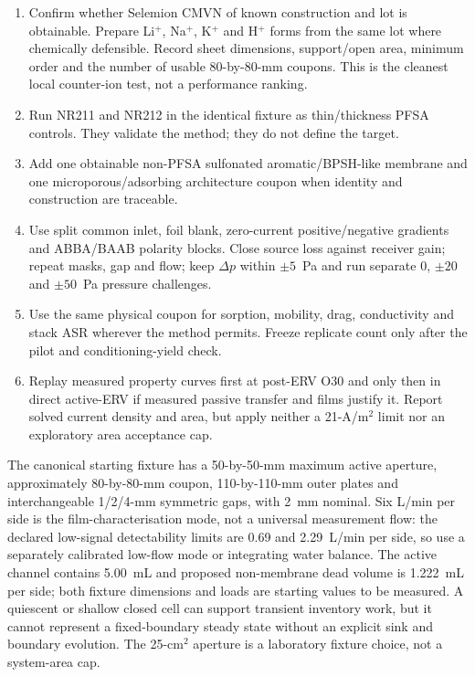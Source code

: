 \documentclass[10pt,a4paper]{article}
\begin{document}
\begin{enumerate}
  \item Confirm whether Selemion CMVN of known construction and lot is
    obtainable. Prepare Li$^+$, Na$^+$, K$^+$ and H$^+$ forms from the same lot
    where chemically defensible. Record sheet dimensions, support/open area,
    minimum order and the number of usable 80-by-80-mm coupons. This is the
    cleanest local counter-ion test, not a performance ranking.
  \item Run NR211 and NR212 in the identical fixture as thin/thickness PFSA
    controls. They validate the method; they do not define the target.
  \item Add one obtainable non-PFSA sulfonated aromatic/BPSH-like membrane and
    one microporous/adsorbing architecture coupon when identity and construction
    are traceable.
  \item Use split common inlet, foil blank, zero-current positive/negative
    gradients and ABBA/BAAB polarity blocks. Close source loss against receiver
    gain; repeat masks, gap and flow; keep $\Delta p$ within $\pm5$~Pa and run
    separate 0, $\pm20$ and $\pm50$~Pa pressure challenges.
  \item Use the same physical coupon for sorption, mobility, drag, conductivity
    and stack ASR wherever the method permits. Freeze replicate count only
    after the pilot and conditioning-yield check.
  \item Replay measured property curves first at post-ERV O30 and only then in
    direct active-ERV if measured passive transfer and films justify it. Report
    solved current density and area, but apply neither a 21-A/m$^2$ limit nor an
    exploratory area acceptance cap.
\end{enumerate}

The canonical starting fixture has a 50-by-50-mm maximum active aperture,
approximately 80-by-80-mm coupon, 110-by-110-mm outer plates and interchangeable
1/2/4-mm symmetric gaps, with 2~mm nominal. Six L/min per side is the
film-characterisation mode, not a universal measurement flow: the declared
low-signal detectability limits are 0.69 and 2.29~L/min per side, so use a
separately calibrated low-flow mode or integrating water balance. The active
channel contains 5.00~mL and proposed non-membrane dead volume is 1.222~mL per
side; both fixture dimensions and loads are starting values to be measured.
A quiescent or shallow closed cell can support transient inventory work, but it
cannot represent a fixed-boundary steady state without an explicit sink and
boundary evolution. The 25-cm$^2$ aperture is a laboratory fixture choice, not
a system-area cap.
\end{document}
